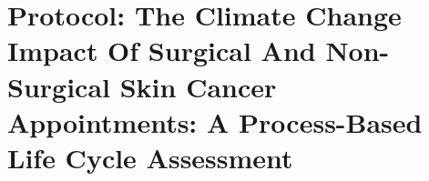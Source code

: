 \chapter{Protocol: The Climate Change Impact Of Surgical And Non-Surgical Skin Cancer Appointments: A Process-Based Life Cycle Assessment}
\label{ap-f}

